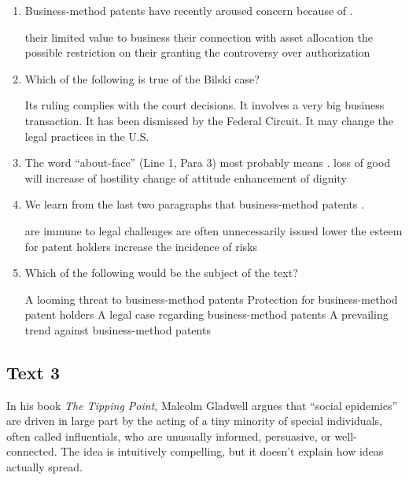 \begin{enumerate}[resume]
	\item
Business-method patents have recently aroused concern
because of \lineread.

\fourchoices
{their limited value to business}
{their connection with asset allocation}
{the possible restriction on their granting}
{the controversy over authorization}



\item
Which of the following is true of the Bilski case?

\fourchoices
{Its ruling complies with the court decisions.}
{It involves a very big business transaction.}
{It has been dismissed by the Federal Circuit.}
{It may change the legal practices in the U.S.}


\item
The word ``about-face'' (Line 1, Para 3) most probably
means \lineread.
\fourchoices
{loss of good will}
{increase of hostility}
{change of attitude}
{enhancement of dignity}



\item
We learn from the last two paragraphs that business-method
patents \lineread.

\fourchoices
{are immune to legal challenges}
{are often unnecessarily issued}
{lower the esteem for patent holders}
{increase the incidence of risks}



\item
Which of the following would be the subject of the text?

\fourchoices
{A looming threat to business-method patents}
{Protection for business-method patent holders}
{A legal case regarding business-method patents}
{A prevailing trend against business-method patents}


\end{enumerate}


\newpage
\subsection{Text 3}


In his book \emph{The Tipping Point}, Malcolm Gladwell argues that ``social
epidemics'' are driven in large part by the acting of a tiny minority of
special individuals, often called influentials, who are unusually
informed, persuasive, or well-connected. The idea is intuitively
compelling, but it doesn't explain how ideas actually spread.

